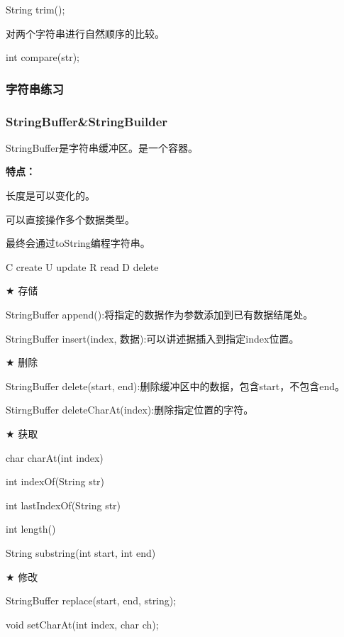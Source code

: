 \documentclass[UTF8]{ctexart}
\begin{document}
\qquad \quad String trim();

\qquad \textbullet 对两个字符串进行自然顺序的比较。

\qquad \quad int compare(str);



\subsubsection{字符串练习}





\subsubsection{StringBuffer\&StringBuilder}

StringBuffer是字符串缓冲区。是一个容器。

\textbf{特点：}

\textbullet 长度是可以变化的。

\textbullet 可以直接操作多个数据类型。

\textbullet 最终会通过toString编程字符串。

C create U update R read D delete

$\bigstar$ 存储

\qquad StringBuffer append():将指定的数据作为参数添加到已有数据结尾处。

\qquad StringBuffer insert(index, 数据):可以讲述据插入到指定index位置。

$\bigstar$ 删除

\qquad StringBuffer delete(start, end):删除缓冲区中的数据，包含start，不包含end。

\qquad StirngBuffer deleteCharAt(index):删除指定位置的字符。

$\bigstar$ 获取

\qquad char charAt(int index)

\qquad int indexOf(String str)

\qquad int lastIndexOf(String str)

\qquad int length()

\qquad String substring(int start, int end)

$\bigstar$ 修改

\qquad StringBuffer replace(start, end, string);

\qquad void setCharAt(int index, char ch);
\end{document}
